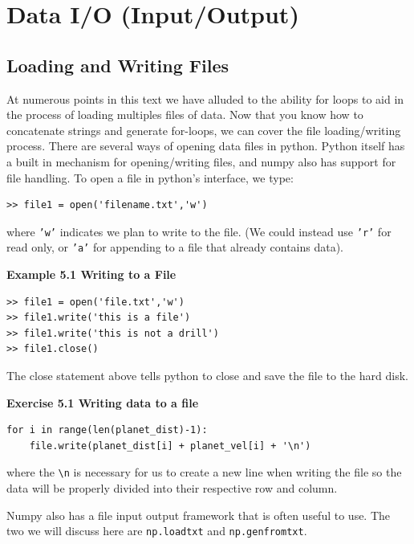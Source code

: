 \chapter{Data I/O (Input/Output)} %

\section{Loading and Writing Files} %
At numerous points in this text we have alluded to the ability for loops to aid in the process of loading multiples files of data. %
Now that you know how to concatenate strings and generate for-loops, we can cover the file loading/writing process. %
There are several ways of opening data files in python. %
Python itself has a built in mechanism for opening/writing files, and numpy also has support for file handling. %
To open a file in python's interface, we type: %

\begin{lstlisting}
>> file1 = open('filename.txt','w')
\end{lstlisting} %

where \texttt{'w'} indicates we plan to write to the file. %
(We could instead use \texttt{'r'} for read only, or \texttt{'a'} for appending to a file that already contains data). %

\textbf{Example 5.1 Writing to a File} %
\begin{lstlisting}
>> file1 = open('file.txt','w')
>> file1.write('this is a file')
>> file1.write('this is not a drill')
>> file1.close()
\end{lstlisting} %

The close statement above tells python to close and save the file to the hard disk. %

\textbf{Exercise 5.1 Writing data to a file} %
\begin{lstlisting}
for i in range(len(planet_dist)-1):
    file.write(planet_dist[i] + planet_vel[i] + '\n')
\end{lstlisting} %

where the \texttt{\textbackslash n} is necessary for us to create a new line when writing the file so the data will be properly divided into their respective row and column. %

Numpy also has a file input output framework that is often useful to use. %
The two we will discuss here are \texttt{np.loadtxt} and \texttt{np.genfromtxt}. %

